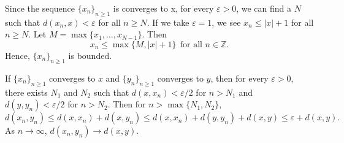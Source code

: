 
\begin{solution}
    Since the sequence $\{x_n\}_{n \geq 1}$ is converges
    to x,
    for every $\varepsilon>0$, we can find a $N$ such that
    $d(x_n,x)<\varepsilon$ for all $n\geq N$. If we take
    $\varepsilon=1$, we see $x_n\leq|x|+1$ for all
    $n\geq N$. Let $M=\max\{x_1,\ldots,x_{N-1}\}$. Then
    $$x_n\leq \max\{M,|x|+1\}\ \ \text{for all }n\in
    \mathbb{Z}.$$
    Hence, $\{x_n\}_{n \geq 1}$ is bounded.

    \vspace*{3mm}
    If $\{x_n\}_{n \geq 1}$ converges to $x$ and
    $\{y_n\}_{n \geq 1}$ converges to $y$, then for every
    $\varepsilon>0$, there exists $N_1$ and $N_2$ such
    that $d(x,x_n)<\varepsilon/2$ for $n>N_1$ and
    $d(y,y_n)<\varepsilon/2$ for $n>N_2$. Then
    for $n>\max\{N_1, N_2\}$,
    $$d(x_n,y_n)\leq d(x,x_n)+d(x,y_n)\leq
    d(x,x_n)+d(y,y_n)+d(x,y)\leq\varepsilon+d(x,y).$$
    As $n\to\infty$, $d(x_n,y_n)\to d(x,y)$.
\end{solution}